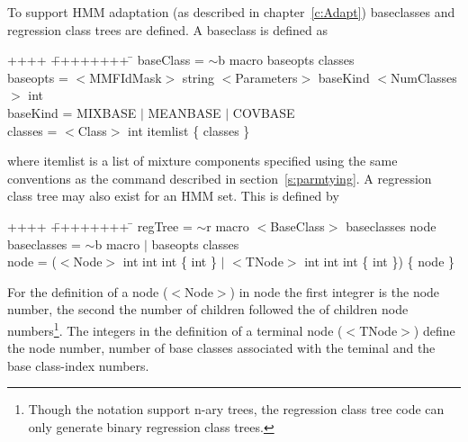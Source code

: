 To support HMM adaptation (as described in
chapter~\ref{c:Adapt}) baseclasses and regression class trees are
defined.  A baseclass is defined as {\sf
\begin{tabbing}
++++ \= ++++++++ \=  \kill
\>   baseClass = \> $\sim$b macro  baseopts classes\\
\>   baseopts  =  \> $<$MMFIdMask$>$ string $<$Parameters$>$ baseKind $<$NumClasses$>$ int\\
\>   baseKind  = \>MIXBASE $|$ MEANBASE $|$ COVBASE \\
\>   classes   = \> $<$Class$>$ int itemlist  \{ classes \} \\
\end{tabbing}
} 
\noindent
where itemlist is a list of mixture components specified using
the same conventions as the  command
described in section~\ref{s:parmtying}.  A regression class tree may
also exist for an HMM set. This is defined by {\sf
\begin{tabbing}
++++ \= ++++++++ \=  \kill
\>   regTree = \> $\sim$r macro $<$BaseClass$>$ baseclasses node \\
\>   baseclasses = \> $\sim$b macro $|$ baseopts classes \\
\>   node    = \> ($<$Node$>$ int int int \{ int \}  $|$ $<$TNode$>$ int int
int \{ int \}) \{ node \}
\end{tabbing}
}
\noindent
For the definition of a node ($<$Node$>$) in {\sf node} the first integrer is the 
node number, the second the number of children followed the of children
node numbers\footnote{Though the notation support n-ary trees, the regression
class tree code can only generate binary regression class trees.}. The 
integers in the definition of a terminal node ($<$TNode$>$) define the node number, 
number of base classes associated with the teminal and the base class-index numbers.

